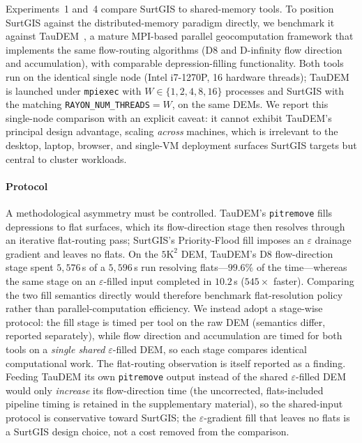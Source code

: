 \documentclass[preprint,review,12pt,authoryear]{elsarticle}
\newif\ifmarkedrev
\newcommand{\revtext}[1]{\ifmarkedrev\textcolor{blue}{#1}\else#1\fi}
\begin{document}
\revtext{Experiments~1 and~4 compare SurtGIS to shared-memory tools. To position SurtGIS against the distributed-memory paradigm directly, we benchmark it against TauDEM~\citep{tarboton2015taudem}, a mature MPI-based parallel geocomputation framework that implements the same flow-routing algorithms (D8 and D-infinity flow direction and accumulation), with comparable depression-filling functionality. Both tools run on the identical single node (Intel i7-1270P, 16 hardware threads); TauDEM is launched under \texttt{mpiexec} with $W \in \{1,2,4,8,16\}$ processes and SurtGIS with the matching \texttt{RAYON\_NUM\_THREADS}$=W$, on the same DEMs. We report this single-node comparison with an explicit caveat: it cannot exhibit TauDEM's principal design advantage, scaling \emph{across} machines, which is irrelevant to the desktop, laptop, browser, and single-VM deployment surfaces SurtGIS targets but central to cluster workloads.}

\paragraph{\revtext{Protocol}} \revtext{A methodological asymmetry must be controlled. TauDEM's \texttt{pitremove} fills depressions to flat surfaces, which its flow-direction stage then resolves through an iterative flat-routing pass; SurtGIS's Priority-Flood fill imposes an $\varepsilon$ drainage gradient and leaves no flats. On the $5\text{K}^2$ DEM, TauDEM's D8 flow-direction stage spent $5{,}576$\,s of a $5{,}596$\,s run resolving flats---$99.6\%$ of the time---whereas the same stage on an $\varepsilon$-filled input completed in $10.2$\,s ($545\times$ faster). Comparing the two fill semantics directly would therefore benchmark flat-resolution policy rather than parallel-computation efficiency. We instead adopt a stage-wise protocol: the fill stage is timed per tool on the raw DEM (semantics differ, reported separately), while flow direction and accumulation are timed for both tools on a \emph{single shared} $\varepsilon$-filled DEM, so each stage compares identical computational work. The flat-routing observation is itself reported as a finding. Feeding TauDEM its own \texttt{pitremove} output instead of the shared $\varepsilon$-filled DEM would only \emph{increase} its flow-direction time (the uncorrected, flats-included pipeline timing is retained in the supplementary material), so the shared-input protocol is conservative toward SurtGIS; the $\varepsilon$-gradient fill that leaves no flats is a SurtGIS design choice, not a cost removed from the comparison.}
\end{document}
